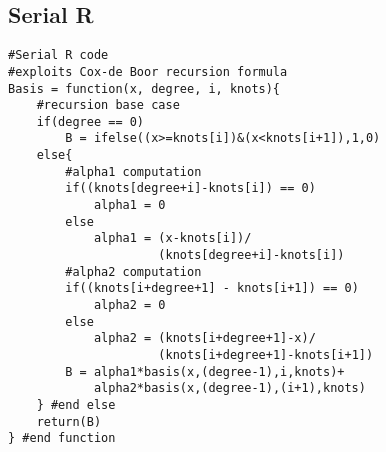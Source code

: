 \subsection{Serial R}
\lstset{language=R}
\begin{lstlisting}
#Serial R code
#exploits Cox-de Boor recursion formula
Basis = function(x, degree, i, knots){
    #recursion base case
    if(degree == 0)
        B = ifelse((x>=knots[i])&(x<knots[i+1]),1,0)
    else{
        #alpha1 computation
        if((knots[degree+i]-knots[i]) == 0)
            alpha1 = 0
        else
            alpha1 = (x-knots[i])/
                     (knots[degree+i]-knots[i])
        #alpha2 computation
        if((knots[i+degree+1] - knots[i+1]) == 0)
            alpha2 = 0
        else
            alpha2 = (knots[i+degree+1]-x)/
                     (knots[i+degree+1]-knots[i+1])
        B = alpha1*basis(x,(degree-1),i,knots)+
            alpha2*basis(x,(degree-1),(i+1),knots)
    } #end else
    return(B)
} #end function
\end{lstlisting}

